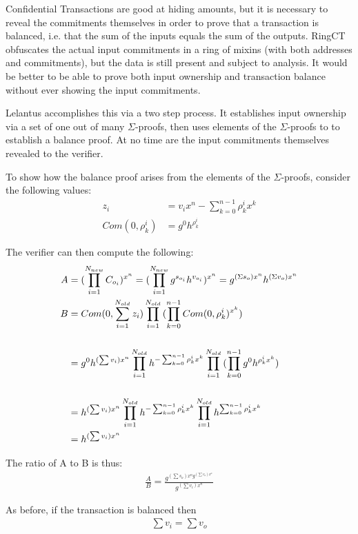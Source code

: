\documentclass{article}
\begin{document}
Confidential Transactions are good at hiding amounts, but it is necessary to reveal the commitments themselves in order to prove that a transaction is balanced, i.e. that the sum of the inputs equals the sum of the outputs.  RingCT obfuscates the actual input commitments in a ring of mixins (with both addresses and commitments), but the data is still present and subject to analysis.  It would be better to be able to prove both input ownership and transaction balance without ever showing the input commitments.

Lelantus accomplishes this via a two step process.  It establishes input ownership via a set of one out of many $\Sigma$-proofs, then uses elements of the $\Sigma$-proofs to to establish a balance proof.  At no time are the input commitments themselves revealed to the verifier.

To show how the balance proof arises from the elements of the $\Sigma$-proofs, consider the following values:
\begin{align}
  z_i &= v_i x^n - \sum_{k=0}^{n-1}{\rho_k^i x^k}\\
  Com(0, \rho_k^i) &= g^0 h^{\rho_k^i}
\end{align}

The verifier can then compute the following:
\begin{align}
  A &= (\prod_{i=1}^{N_{new}}{C_{o_i}})^{x^n} = (\prod_{i=1}^{N_{new}}{g^{s_{o_i}} h^{v_{o_i}}})^{x^n}  =  g^{(\Sigma s_o) x^n}  h^{(\Sigma v_o) x^n}\\
  B &= Com(0, \sum_{i=1}^{N_{old}}{z_i}) \prod_{i=1}^{N_{old}}{(\prod_{k=0}^{n-1} Com(0, \rho_k^i)^{x^k})}\\
  \cr &= g^0 h^{(\sum{v_i}) x^n} \prod_{i=1}^{N_{old}}{h^{-\sum_{k=0}^{n-1}{\rho_k^i x^k}}} \prod_{i=1}^{N_{old}}{(\prod_{k=0}^{n-1}{g^0 h^{\rho_k^i x^k}})}\\
  \cr &= h^{(\sum{v_i}) x^n} \prod_{i=1}^{N_{old}}{h^{-\sum_{k=0}^{n-1}{\rho_k^i x^k}}}  \prod_{i=1}^{N_{old}}{h^{\sum_{k=0}^{n-1}{\rho_k^i x^k}}}
  \cr &= h^{(\sum{v_i}) x^n}
\end{align}

The ratio of A to B is thus:
\begin{align}
  \frac{A}{B} = \frac{g^{(\sum{s_o}) x^n g^{(\sum{v_o}) x^n}}}{g^{(\sum{v_i}) x^n}}
\end{align}
  
As before, if the transaction is balanced then 
\begin{align}
  \sum{v_i} = \sum{v_o}
\end{align}
\end{document}
